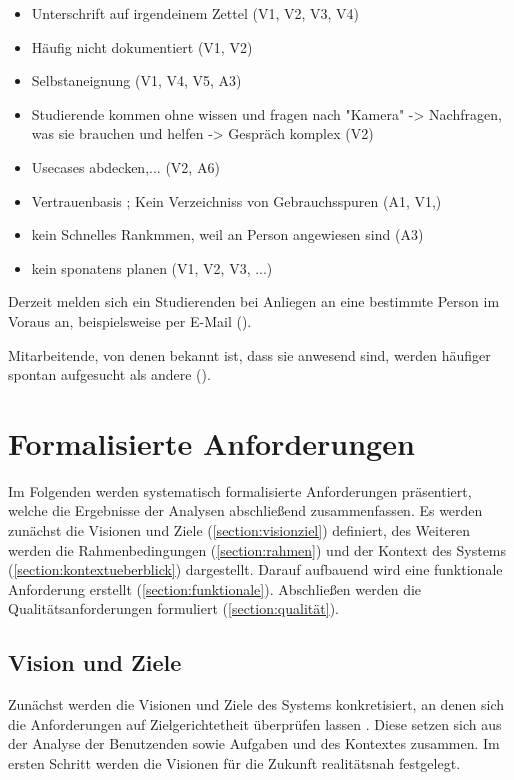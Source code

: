 \begin{itemize}
        \item Unterschrift auf irgendeinem Zettel (V1, V2, V3, V4)
        \item Häufig nicht dokumentiert (V1, V2)
        \item Selbstaneignung (V1, V4, V5, A3)
        \item Studierende kommen ohne wissen und fragen nach "Kamera" -> Nachfragen, was sie
        brauchen und helfen -> Gespräch komplex (V2)
        \item Usecases abdecken,... (V2, A6)
        \item Vertrauenbasis ; Kein Verzeichniss von Gebrauchsspuren (A1, V1,)
        \item kein Schnelles Rankmmen, weil an Person angewiesen sind (A3)
        \item kein sponatens planen (V1, V2, V3, ...)
\end{itemize}


Derzeit melden sich ein Studierenden bei Anliegen an eine bestimmte Person im Voraus an,
beispielsweise per E-Mail ().

Mitarbeitende, von denen bekannt ist, dass sie anwesend sind, werden häufiger spontan aufgesucht als
andere ().


\section{Formalisierte Anforderungen}
\label{section:anforderung}

Im Folgenden werden systematisch formalisierte Anforderungen präsentiert, welche die Ergebnisse der
Analysen abschließend zusammenfassen. Es werden zunächst die Visionen und Ziele
(\ref{section:visionziel}) definiert, des Weiteren werden die Rahmenbedingungen
(\ref{section:rahmen}) und der Kontext des Systems (\ref{section:kontextueberblick}) dargestellt.
Darauf aufbauend wird eine funktionale Anforderung erstellt (\ref{section:funktionale}). Abschließen
werden die Qualitätsanforderungen formuliert (\ref{section:qualität}).


\subsection*{Vision und Ziele}
\label{section:visionziel}
Zunächst werden die Visionen und Ziele des Systems konkretisiert, an denen sich die Anforderungen
auf Zielgerichtetheit überprüfen lassen \cite{balzert2009}. Diese setzen sich aus der Analyse der
Benutzenden sowie Aufgaben und des Kontextes zusammen. Im ersten Schritt werden die Visionen für die
Zukunft realitätsnah festgelegt.



